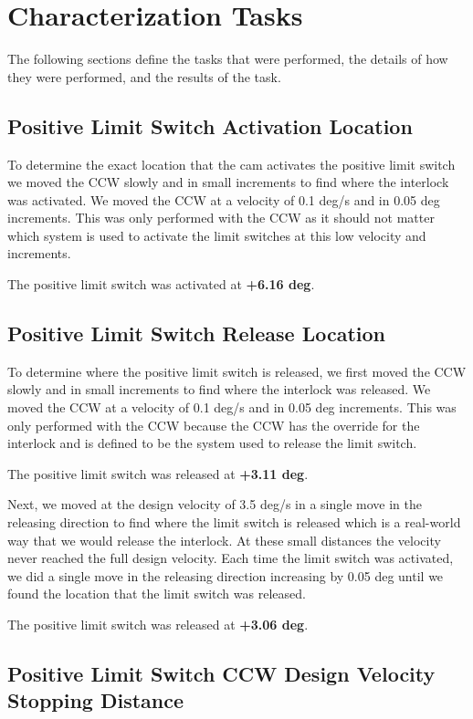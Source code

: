 \documentclass[SE,lsstdraft,authoryear,toc]{lsstdoc}
\begin{document}
\section{Characterization Tasks}

The following sections define the tasks that were performed, the details
of how they were performed, and the results of the task.

\subsection{Positive Limit Switch Activation Location}

To determine the exact location that the cam activates the positive
limit switch we moved the CCW slowly and in small increments to find
where the interlock was activated. We moved the CCW at a velocity of 0.1
deg/s and in 0.05 deg increments. This was only performed with the CCW
as it should not matter which system is used to activate the limit
switches at this low velocity and increments.

The positive limit switch was activated at \textbf{+6.16 deg}.

\subsection{Positive Limit Switch Release Location}

To determine where the positive limit switch is released, we first moved
the CCW slowly and in small increments to find where the interlock was
released. We moved the CCW at a velocity of 0.1 deg/s and in 0.05 deg
increments. This was only performed with the CCW because the CCW has the
override for the interlock and is defined to be the system used to
release the limit switch.

The positive limit switch was released at \textbf{+3.11 deg}.

Next, we moved at the design velocity of 3.5 deg/s in a single move in
the releasing direction to find where the limit switch is released which
is a real-world way that we would release the interlock. At these small
distances the velocity never reached the full design velocity. Each time
the limit switch was activated, we did a single move in the releasing
direction increasing by 0.05 deg until we found the location that the
limit switch was released.

The positive limit switch was released at \textbf{+3.06 deg}.

\subsection{Positive Limit Switch CCW Design Velocity Stopping Distance}
\end{document}
